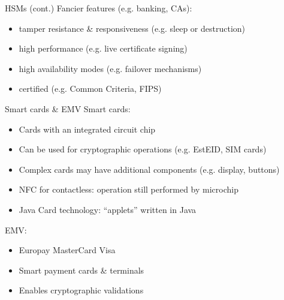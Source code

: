 \begin{frame}{HSMs (cont.)}
  \pause
  Fancier features (e.g. banking, CAs):
  \begin{itemize}[<+(1)->]
    \item tamper resistance \& responsiveness (e.g. sleep or destruction)
    \item high performance (e.g. live certificate signing)
    \item high availability modes (e.g. failover mechanisms)
    \item certified (e.g. Common Criteria, FIPS)
  \end{itemize}
\end{frame}

\begin{frame}{Smart cards \& EMV}
  Smart cards:
  \begin{itemize}[<+(1)->]
    \item Cards with an integrated circuit chip
    \item Can be used for cryptographic operations (e.g. EstEID, SIM cards)
    \item Complex cards may have additional components (e.g. display, buttons)
    \item NFC for contactless: operation still performed by microchip
    \item Java Card technology: \enquote{applets} written in Java
  \end{itemize}

  \vspace*{1em}

  \pause
  EMV:
  \begin{itemize}[<+(1)->]
    \item Europay MasterCard Visa
    \item Smart payment cards \& terminals
    \item Enables cryptographic validations
  \end{itemize}
\end{frame}

